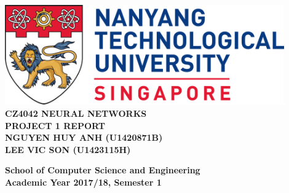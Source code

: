 \documentclass[11pt]{report}
\begin{document}
\begin{titlepage}
    \begin{center}
    
    \includegraphics[width=0.9\textwidth]{images/ntu_logo.png}
    \\[6cm]
    
    \uppercase{
    \textbf{CZ4042 Neural Networks}\\
    \textbf{Project 1 Report}
    \\[3cm]
    \textbf{Nguyen Huy Anh (U1420871B)}\\
    \textbf{Lee Vic Son (U1423115H)}
    }
    
    \vfill
    
    \textbf{School of Computer Science and Engineering}
    \\
    \textbf{Academic Year 2017/18, Semester 1}
    
    \end{center}
\end{titlepage}


\end{document}
